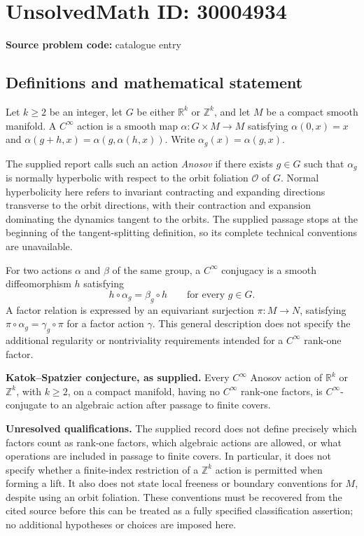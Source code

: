 \documentclass[11pt]{article}
\newcommand{\Z}{\mathbb{Z}}
\newcommand{\R}{\mathbb{R}}
\begin{document}
\section*{UnsolvedMath ID: 30004934}
\textbf{Source problem code:} catalogue entry
\subsection{Definitions and mathematical statement}
Let \(k\geq 2\) be an integer, let \(G\) be either \(\R^k\) or \(\Z^k\), and let \(M\) be a compact smooth manifold. A \(C^\infty\) action is a smooth map \(\alpha:G\times M\to M\) satisfying \(\alpha(0,x)=x\) and \(\alpha(g+h,x)=\alpha(g,\alpha(h,x))\). Write \(\alpha_g(x)=\alpha(g,x)\).

The supplied report calls such an action \emph{Anosov} if there exists \(g\in G\) such that \(\alpha_g\) is normally hyperbolic with respect to the orbit foliation \(\mathcal O\) of \(G\). Normal hyperbolicity here refers to invariant contracting and expanding directions transverse to the orbit directions, with their contraction and expansion dominating the dynamics tangent to the orbits. The supplied passage stops at the beginning of the tangent-splitting definition, so its complete technical conventions are unavailable.

For two actions \(\alpha\) and \(\beta\) of the same group, a \(C^\infty\) conjugacy is a smooth diffeomorphism \(h\) satisfying
\[
 h\circ\alpha_g=\beta_g\circ h\qquad\text{for every }g\in G.
\]
A factor relation is expressed by an equivariant surjection \(\pi:M\to N\), satisfying \(\pi\circ\alpha_g=\gamma_g\circ\pi\) for a factor action \(\gamma\). This general description does not specify the additional regularity or nontriviality requirements intended for a \(C^\infty\) rank-one factor.

\textbf{Katok--Spatzier conjecture, as supplied.} Every \(C^\infty\) Anosov action of \(\R^k\) or \(\Z^k\), with \(k\geq2\), on a compact manifold, having no \(C^\infty\) rank-one factors, is \(C^\infty\)-conjugate to an algebraic action after passage to finite covers.

\textbf{Unresolved qualifications.} The supplied record does not define precisely which factors count as rank-one factors, which algebraic actions are allowed, or what operations are included in passage to finite covers. In particular, it does not specify whether a finite-index restriction of a \(\Z^k\) action is permitted when forming a lift. It also does not state local freeness or boundary conventions for \(M\), despite using an orbit foliation. These conventions must be recovered from the cited source before this can be treated as a fully specified classification assertion; no additional hypotheses or choices are imposed here.
\end{document}
